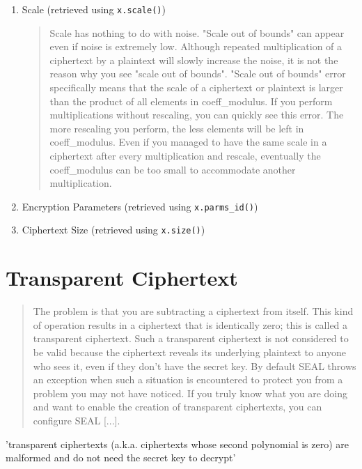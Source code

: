 \begin{enumerate}
  \item Scale (retrieved using \texttt{x.scale()})
        \begin{quote}
          Scale has nothing to do with noise. "Scale out of bounds" can appear even if noise is extremely low. Although repeated multiplication of a ciphertext by a plaintext will slowly increase the noise, it is not the reason why you see "scale out of bounds".
          "Scale out of bounds" error specifically means that the scale of a ciphertext or plaintext is larger than the product of all elements in coeff\_modulus. If you perform multiplications without rescaling, you can quickly see this error. The more rescaling you perform, the less elements will be left in coeff\_modulus. Even if you managed to have the same scale in a ciphertext after every multiplication and rescale, eventually the coeff\_modulus can be too small to accommodate another multiplication.
        \end{quote}
  \item Encryption Parameters (retrieved using \texttt{x.parms_id()})
  \item Ciphertext Size (retrieved using \texttt{x.size()})
\end{enumerate}

\section{Transparent Ciphertext}
\begin{quote}
  The problem is that you are subtracting a ciphertext from itself.
  This kind of operation results in a ciphertext that is identically zero;
  this is called a transparent ciphertext. Such a transparent ciphertext
  is not considered to be valid because the ciphertext reveals its underlying plaintext to anyone who sees it,
  even if they don't have the secret key.
  By default SEAL throws an exception when such a situation is encountered to protect you from a problem you may not have noticed.
  If you truly know what you are doing and want to enable the creation of transparent ciphertexts,
  you can configure SEAL [...].
  \parencite{kim-laine-on-transparent-ciphertexts}
\end{quote}

'transparent ciphertexts (a.k.a. ciphertexts whose second polynomial is zero) are malformed and do not need the secret key to decrypt'
